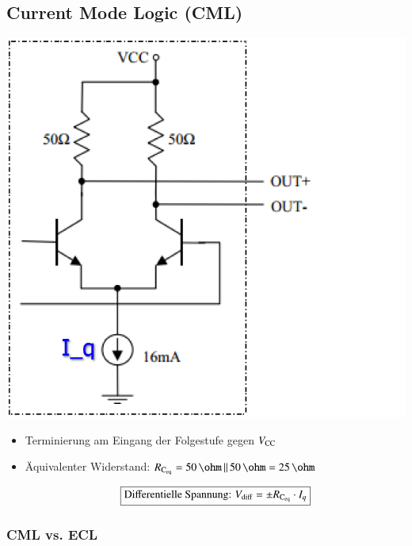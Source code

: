 \subsection{Current Mode Logic (CML)}

\begin{minipage}[c]{0.25\columnwidth}
    \includegraphics[width=\columnwidth]{images/CML.png}
\end{minipage}
\hfill
\begin{minipage}[c]{0.72\columnwidth}
   \begin{itemize}
    \item Terminierung am Eingang der Folgestufe gegen $V_{\rm CC}$
    \item Äquivalenter Widerstand: $R_{\rm C_{\rm eq}} = 50 \, \ohm \, || \, 50 \, \ohm = 25 \, \ohm$
    
    $$ \boxed{ \text{Differentielle Spannung: } V_{\rm diff} = \pm R_{\rm C_{\rm eq}} \cdot I_q }$$
   \end{itemize}
\end{minipage}


\subsubsection{CML vs. ECL}


